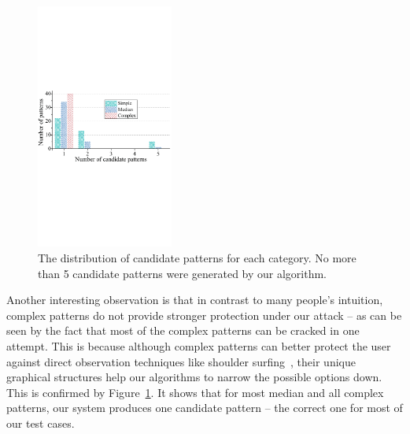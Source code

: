 \begin{figure}[!t]
    \centering
    \includegraphics[width=0.4\textwidth]{fig/11.pdf}
    \vspace{-3mm}
    \caption{The distribution of candidate patterns for each category. No more than 5 candidate patterns were generated by our algorithm. }
    \label{fig:fig11}
    \vspace{-4mm}
\end{figure}

        Another interesting observation is that in contrast to many people's
        intuition, complex patterns do not provide stronger protection under our attack -- as can be seen by the fact that
        most of the complex patterns can be cracked in one attempt.
        This is because although complex patterns can better protect the user against direct observation techniques like shoulder surfing~\cite{shoulder}, their unique graphical structures
        help our algorithms to narrow the possible options down. This is
        confirmed by Figure~\ref{fig:fig11}. It shows that for most median and all complex patterns, our system produces one candidate pattern --
        the correct one for most of our test cases.




